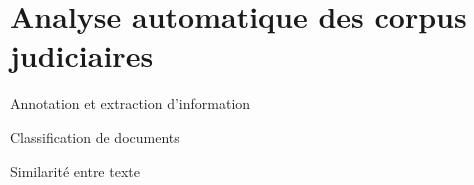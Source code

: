 \section{Analyse automatique des corpus judiciaires}

\begin{frame}[c]{Annotation et extraction d'information}
	
\end{frame}

\begin{frame}[c]{Classification de documents}
	
\end{frame}

\begin{frame}[c]{Similarité entre texte}
	
\end{frame}